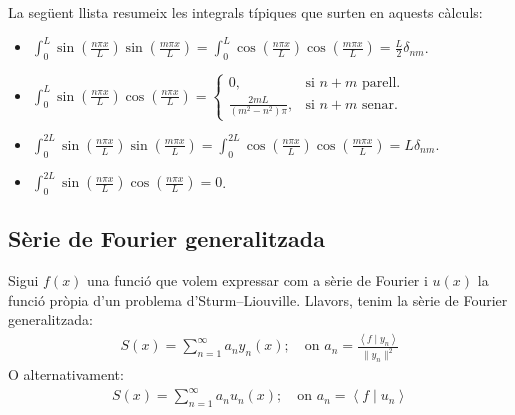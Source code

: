 La següent llista resumeix les integrals típiques que surten en aquests càlculs:
\begin{itemize}
    \item $\displaystyle \int_{0}^{L} \sin \left( \frac{n \pi x}{L} \right) \sin \left( \frac{m \pi x}{L} \right) = \int_{0}^{L} \cos \left( \frac{n \pi x}{L} \right) \cos \left( \frac{m \pi x}{L} \right) = \frac{L}{2} \delta_{nm}$.
    \item $\displaystyle \int_{0}^{L} \sin \left( \frac{n \pi x}{L} \right) \cos \left( \frac{n \pi x}{L} \right) = \begin{cases} 0, & \text{si } n+m \text{ parell.} \\ \displaystyle \frac{2mL}{(m^{2}-n^{2})\pi}, &  \text{si } n+m \text{ senar.} \end{cases}$
    \item $\displaystyle \int_{0}^{2L} \sin \left( \frac{n \pi x}{L} \right) \sin \left( \frac{m \pi x}{L} \right) = \int_{0}^{2L} \cos \left( \frac{n \pi x}{L} \right) \cos \left( \frac{m \pi x}{L} \right) = L \delta_{nm}$.
    \item $\displaystyle \int_{0}^{2L} \sin \left( \frac{n \pi x}{L} \right) \cos \left( \frac{n \pi x}{L} \right) = 0$.
\end{itemize}

\subsection{Sèrie de Fourier generalitzada}
Sigui $f(x)$ una funció que volem expressar com a sèrie de Fourier i $u(x)$ la funció pròpia d'un problema d'Sturm--Liouville. Llavors, tenim la sèrie de Fourier generalitzada:
\begin{align}
    S(x) = \sum_{n=1}^{\infty} a_{n} y_{n}(x); \quad \text{on } a_{n} = \frac{\left< f \mid y_{n} \right>}{\| y_{n} \|^{2}}
\end{align}
O alternativament:
\begin{align}
    S(x) = \sum_{n=1}^{\infty} a_{n} u_{n}(x); \quad \text{on } a_{n} = \left< f \mid u_{n} \right>
\end{align}

